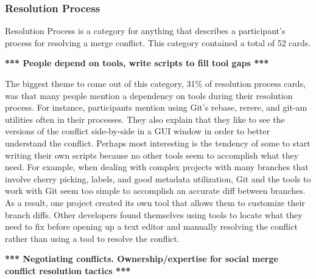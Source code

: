 \documentclass[conference]{IEEEtran}
\begin{document}
\subsubsection{Resolution Process}

Resolution Process is a category for anything that describes a participant's process for resolving a merge conflict. This category contained a total of 52 cards.

\textbf{*** People depend on tools, write scripts to fill tool gaps ***}

The biggest theme to come out of this category, 31\% of resolution process cards, was that many people mention a dependency on tools during their resolution process. For instance, participants mention using Git's rebase, rerere, and git-am utilities often in their processes. They also explain that they like to see the versions of the conflict side-by-side in a GUI window in order to better understand the conflict. Perhaps most interesting is the tendency of some to start writing their own scripts because no other tools seem to accomplish what they need. For example, when dealing with complex projects with many branches that involve cherry picking, labels, and good metadata utilization, Git and the tools to work with Git seem too simple to accomplish an accurate diff between branches. As a result, one project created its own tool that allows them to customize their branch diffs. Other developers found themselves using tools to locate what they need to fix before opening up a text editor and manually resolving the conflict rather than using a tool to resolve the conflict.

\textbf{*** Negotiating conflicts. Ownership/expertise for social merge conflict resolution tactics ***}
\end{document}
